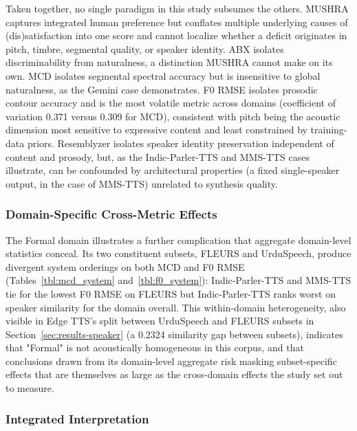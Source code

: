 \documentclass[a4paper,fleqn]{cas-dc}
\begin{document}
    \begin{sloppypar}
    \hspace*{1.2em} Taken together, no single paradigm in this study subsumes the others. MUSHRA captures integrated human preference but conflates multiple underlying causes of (dis)satisfaction into one score and cannot localize whether a deficit originates in pitch, timbre, segmental quality, or
    speaker identity. ABX isolates discriminability from naturalness, a
    distinction MUSHRA cannot make on its own. MCD isolates segmental spectral
    accuracy but is insensitive to global naturalness, as the Gemini case
    demonstrates. F0 RMSE isolates prosodic contour accuracy and is the most
    volatile metric across domains (coefficient of variation 0.371 versus
    0.309 for MCD), consistent with pitch being the acoustic dimension most
    sensitive to expressive content and least constrained by training-data
    priors. Resemblyzer isolates speaker identity preservation independent of
    content and prosody, but, as the Indic-Parler-TTS and MMS-TTS
    cases illustrate, can be confounded by architectural properties (a fixed
    single-speaker output, in the case of MMS-TTS) unrelated to synthesis
    quality. 
    \end{sloppypar}
    
    \subsubsection{Domain-Specific Cross-Metric Effects}
    
    \hspace*{1.2em} The Formal domain illustrates a further complication that aggregate domain-level statistics conceal. Its two constituent subsets, FLEURS and UrduSpeech, produce divergent system orderings on both MCD and F0 RMSE (Tables~\ref{tbl:mcd_system} and~\ref{tbl:f0_system}): Indic-Parler-TTS and MMS-TTS tie for the lowest F0 RMSE on FLEURS but Indic-Parler-TTS ranks
    worst on speaker similarity for the domain overall. This within-domain
    heterogeneity, also visible in Edge TTS's split between UrduSpeech and
    FLEURS subsets in Section~\ref{sec:results-speaker} (a 0.2324 similarity
    gap between subsets), indicates that "Formal" is not acoustically
    homogeneous in this corpus, and that conclusions drawn from its
    domain-level aggregate risk masking subset-specific effects that are
    themselves as large as the cross-domain effects the study set out to
    measure.
    
    \subsubsection{Integrated Interpretation}
    
\end{document}
